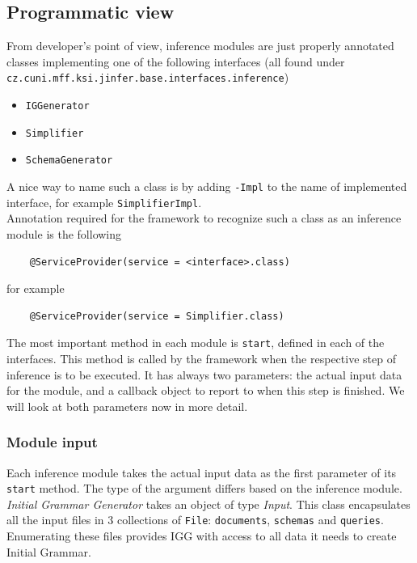 \documentclass[a4paper,10pt,oneside]{article}
\newcommand{\code}[1]{\texttt{#1}}
\newcommand{\jmodule}[1]{\emph{#1}}
\begin{document}

\subsection{Programmatic view}

From developer's point of view, inference modules are just properly annotated classes implementing one of the following interfaces (all found under \code{cz.cuni.mff.ksi.jinfer.base.interfaces.inference})

\begin{itemize}
	\item \code{IGGenerator}
	\item \code{Simplifier}
	\item \code{SchemaGenerator}
\end{itemize}

A nice way to name such a class is by adding \code{-Impl} to the name of implemented interface, for example \code{SimplifierImpl}.\\


Annotation required for the framework to recognize such a class as an inference module is the following
\begin{verbatim}
	@ServiceProvider(service = <interface>.class)
\end{verbatim}
for example
\begin{verbatim}
	@ServiceProvider(service = Simplifier.class)
\end{verbatim}

The most important method in each module is \code{start}, defined in each of the interfaces. This method is called by the framework when the respective step of inference is to be executed. It has always two parameters: the actual input data for the module, and a callback object to report to when this step is finished. We will look at both parameters now in more detail. 

\subsubsection{Module input}
Each inference module takes the actual input data as the first parameter of its \code{start} method. The type of the argument differs based on the inference module.\\

\jmodule{Initial Grammar Generator} takes an object of type \emph{Input}. This class encapsulates all the input files in 3 collections of \code{File}: \code{documents}, \code{schemas} and \code{queries}. Enumerating these files provides IGG with access to all data it needs to create Initial Grammar.\\
\end{document}
